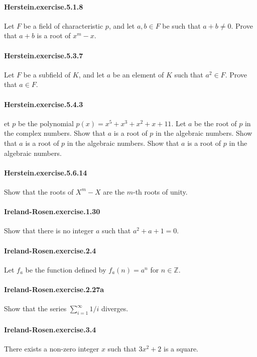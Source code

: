 \documentclass{article}
\begin{document}
\paragraph{Herstein.exercise.5.1.8} Let $F$ be a field of characteristic $p$, and let $a, b \in F$ be such that $a + b \neq 0$. Prove that $a + b$ is a root of $x^m - x$.

\paragraph{Herstein.exercise.5.3.7} Let $F$ be a subfield of $K$, and let $a$ be an element of $K$ such that $a^2 \in F$. Prove that $a \in F$.

\paragraph{Herstein.exercise.5.4.3} et $p$ be the polynomial $p(x)=x^5+x^3+x^2+x+11$. Let $a$ be the root of $p$ in the complex numbers. Show that $a$ is a root of $p$ in the algebraic numbers. Show that $a$ is a root of $p$ in the algebraic numbers. Show that $a$ is a root of $p$ in the algebraic numbers.

\paragraph{Herstein.exercise.5.6.14} Show that the roots of $X ^ m - X$ are the $m$-th roots of unity.

\paragraph{Ireland-Rosen.exercise.1.30} Show that there is no integer $a$ such that $a^2 + a + 1 = 0$.

\paragraph{Ireland-Rosen.exercise.2.4} Let $f_a$ be the function defined by $f_a(n)=a^n$ for $n \in \mathbb{Z}$.

\paragraph{Ireland-Rosen.exercise.2.27a} Show that the series
  $\sum_{i=1}^\infty 1/i$ diverges.

\paragraph{Ireland-Rosen.exercise.3.4} There exists a non-zero integer $x$ such that $3x^2 + 2$ is a square.
\end{document}
